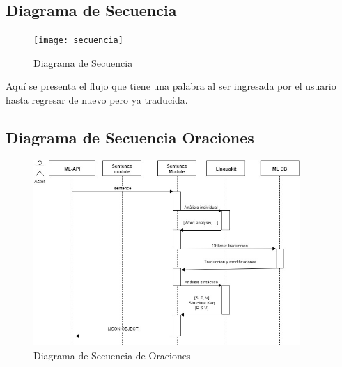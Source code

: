 \documentclass[a4paper,openright,11pt]{article}
\begin{document}
\subsection{Diagrama de Secuencia}
\begin{figure}[h]
	\centering
	\texttt{[image: secuencia]}
	\caption{Diagrama de Secuencia}
	\label{fig:sec}
\end{figure}
Aquí se presenta el flujo que tiene una palabra al ser ingresada por el usuario hasta regresar de nuevo pero ya traducida.

\subsection{Diagrama de Secuencia Oraciones}
\begin{figure}[h]
	\centering
	\includegraphics[width=0.9\textwidth]{secuenciaoracion}
	\caption{Diagrama de Secuencia de Oraciones}
	\label{fig:seco}
\end{figure}
\newpage
\end{document}
